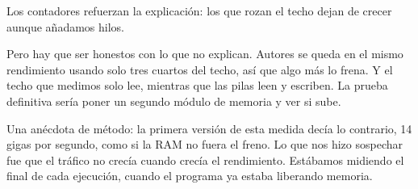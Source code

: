 Los contadores refuerzan la explicación: los que rozan el techo dejan de crecer aunque añadamos hilos.

Pero hay que ser honestos con lo que no explican. Autores se queda en el mismo rendimiento usando solo tres cuartos del techo, así que algo más lo frena. Y el techo que medimos solo lee, mientras que las pilas leen y escriben. La prueba definitiva sería poner un segundo módulo de memoria y ver si sube.

Una anécdota de método: la primera versión de esta medida decía lo contrario, 14 gigas por segundo, como si la RAM no fuera el freno. Lo que nos hizo sospechar fue que el tráfico no crecía cuando crecía el rendimiento. Estábamos midiendo el final de cada ejecución, cuando el programa ya estaba liberando memoria.
